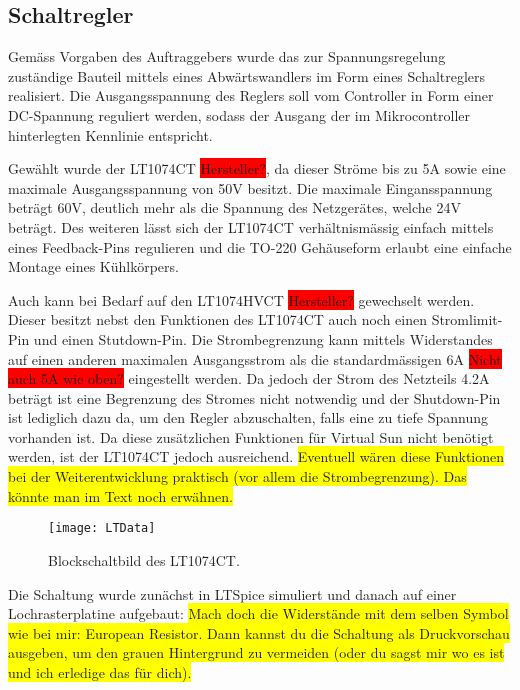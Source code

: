 \subsection{Schaltregler}\label{schaltregler}

Gemäss Vorgaben des Auftraggebers wurde das zur Spannungsregelung zuständige Bauteil mittels eines Abwärtswandlers im Form eines Schaltreglers realisiert. Die Ausgangsspannung des Reglers soll vom Controller in Form einer DC-Spannung reguliert werden, sodass der Ausgang der im Mikrocontroller hinterlegten Kennlinie entspricht. 

Gewählt wurde der LT1074CT \colorbox{red}{Hersteller?}, da dieser Ströme bis zu 5A sowie eine maximale Ausgangsspannung von 50V besitzt. Die maximale Eingansspannung beträgt 60V, deutlich mehr als die Spannung des Netzgerätes, welche 24V beträgt.
Des weiteren lässt sich der LT1074CT verhältnismässig einfach mittels eines Feedback-Pins regulieren und die TO-220 Gehäuseform erlaubt eine einfache Montage eines Kühlkörpers.

Auch kann bei Bedarf auf den LT1074HVCT \colorbox{red}{Hersteller?} gewechselt werden. Dieser besitzt nebst den Funktionen des LT1074CT auch noch einen Stromlimit-Pin und einen Stutdown-Pin. Die Strombegrenzung kann mittels Widerstandes auf einen anderen maximalen Ausgangsstrom als die standardmässigen 6A \colorbox{red}{Nicht auch 5A wie oben?} eingestellt werden. Da jedoch der Strom des Netzteils 4.2A beträgt ist eine Begrenzung des Stromes nicht notwendig und  der Shutdown-Pin ist lediglich dazu da, um den Regler abzuschalten, falls eine zu tiefe Spannung vorhanden ist. Da diese zusätzlichen Funktionen für Virtual Sun nicht benötigt werden, ist der LT1074CT jedoch ausreichend. \colorbox{yellow}{Eventuell wären diese Funktionen bei der Weiterentwicklung praktisch (vor allem die Strombegrenzung). Das könnte man im Text noch erwähnen.}

\begin{figure}[h]
\centering
\texttt{[image: LTData]}%
\caption{Blockschaltbild des LT1074CT.}
\label{fig::LTData}
\end{figure}

Die Schaltung wurde zunächst in LTSpice simuliert und danach auf einer Lochrasterplatine aufgebaut: \colorbox{yellow}{Mach doch die Widerstände mit dem selben Symbol wie bei mir: European Resistor. Dann kannst du die Schaltung als Druckvorschau ausgeben, um den grauen Hintergrund zu vermeiden (oder du sagst mir wo es ist und ich erledige das für dich).}

